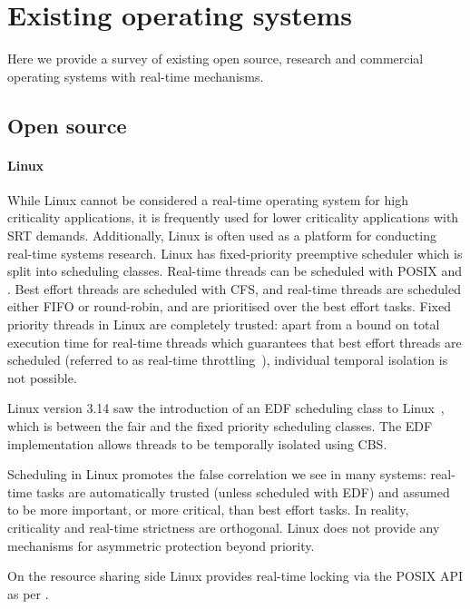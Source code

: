\section{Existing operating systems}

Here we provide a survey of existing open source, research and commercial operating systems with
real-time mechanisms. 

\subsection{Open source}

\paragraph{Linux} While Linux cannot be considered a real-time operating system for high criticality applications, it
is frequently used for lower criticality applications with \gls{SRT} demands.  Additionally, Linux
is often used as a platform for conducting real-time systems research. 
Linux has fixed-priority preemptive scheduler which is split into scheduling classes.  Real-time
threads can be scheduled with \gls{POSIX} \schedfifo and \schedsporadic. Best effort threads are
scheduled with \gls{CFS}, and real-time threads are scheduled either \gls{FIFO} or round-robin, and
are prioritised over the best effort tasks.  Fixed priority threads in Linux are completely trusted:
apart from a bound on total execution time for real-time threads which guarantees that best effort
threads are scheduled (referred to as real-time throttling~\citep{Corbet_08}), individual temporal
isolation is not possible.

Linux version 3.14 saw the introduction of an \gls{EDF} scheduling class to Linux~\citep{Corbet_09},
which is between the fair and the fixed priority scheduling classes.  The \gls{EDF} implementation
allows threads to be temporally isolated using \gls{CBS}.

Scheduling in Linux promotes the false correlation we see in many systems: real-time tasks are
automatically trusted (unless scheduled with \gls{EDF}) and assumed to be more important, or more
critical, than best effort tasks.  In reality, criticality and real-time strictness are orthogonal.
Linux does not provide any mechanisms for asymmetric protection beyond priority.

On the resource sharing side Linux provides real-time locking via the \gls{POSIX} API as per
.

